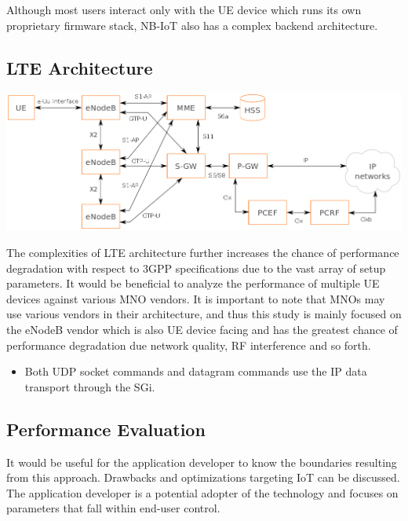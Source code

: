 \documentclass[]{article}
\providecommand{\tightlist}{%
  \setlength{\itemsep}{0pt}\setlength{\parskip}{0pt}}
\let\origfigure\figure
\let\endorigfigure\endfigure
\renewenvironment{figure}[1][2] {
    \expandafter\origfigure\expandafter[H]
} {
    \endorigfigure
}
\begin{document}
Although most users interact only with the UE device which runs its own
proprietary firmware stack, NB-IoT also has a complex backend
architecture.

\hypertarget{lte-architecture}{%
\subsection{LTE Architecture}\label{lte-architecture}}

\begin{figure}
\centering
\includegraphics{../images/LTE_classic_architecture.png}
\caption{LTE\_classic\_architecture}
\end{figure}

The complexities of LTE architecture further increases the chance of
performance degradation with respect to 3GPP specifications due to the
vast array of setup parameters. It would be beneficial to analyze the
performance of multiple UE devices against various MNO vendors. It is
important to note that MNOs may use various vendors in their
architecture, and thus this study is mainly focused on the eNodeB vendor
which is also UE device facing and has the greatest chance of
performance degradation due network quality, RF interference and so
forth.

\begin{itemize}
\tightlist
\item
  Both UDP socket commands and datagram commands use the IP data
  transport through the SGi.
\end{itemize}

\hypertarget{performance-evaluation}{%
\subsection{Performance Evaluation}\label{performance-evaluation}}

It would be useful for the application developer to know the boundaries
resulting from this approach. Drawbacks and optimizations targeting IoT
can be discussed. The application developer is a potential adopter of
the technology and focuses on parameters that fall within end-user
control.
\end{document}
